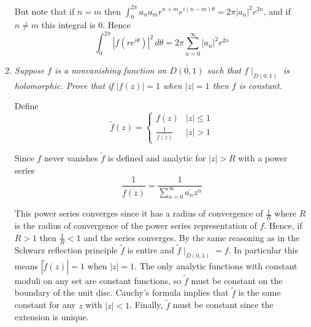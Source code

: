 \documentclass[letterpaper, 11pt]{article}
\begin{document}
\begin{enumerate}
But note that if $n=m$ then $\int_0^{2\pi} a_n\overline{a_m} r^{n+m} e^{i(n-m)\theta} = 2\pi |a_n|^2 r^{2n}$, and if $n \neq m$ this integral is $0$.  Hence
\[
\int_0^{2\pi} \left|f\left(re^{i\theta}\right)\right|^2 \,d\theta = 2\pi \sum_{n=0}^\infty |a_n|^2 r^{2n}
\]

\item \emph{Suppose $f$ is a nonvanishing function on $\overline{D(0,1)}$ such that $f\mid_{D(0,1)}$ is holomorphic.  Prove that if $|f(z)|=1$ when $|z|=1$ then $f$ is constant.}

Define $$\tilde{f}(z) = \begin{cases} f(z) & |z|\leq 1 \\ \frac{1}{\overline{f(\overline{z})}} & |z|>1\end{cases}$$

Since $f$ never vanishes $\tilde{f}$ is defined and analytic for $|z| > R$ with a power series
\[
\frac{1}{\overline{f(\overline{z})}} = \frac{1}{\sum_{n=0}^\infty \overline{a_n} z^n}
\]

This power series converges since it has a radius of convergence of $\frac{1}{R}$ where $R$ is the radius of convergence of the power series representation of $f$.  Hence, if $R > 1$ then $\frac{1}{R} < 1$ and the series converges.  By the same reasoning as in the Schwarz reflection principle $\tilde{f}$ is entire and $\tilde{f}\mid_{\overline{D(0,1)}} = f$.  In particular this means $\left|\tilde{f}(z)\right| = 1$ when $|z| = 1$.  The only analytic functions with constant moduli on any set are constant functions, so $\tilde{f}$ must be constant on the boundary of the unit disc.  Cauchy's formula implies that $\tilde{f}$ is the same constant for any $z$ with $|z| < 1$.  Finally, $\tilde{f}$ must be constant since the extension is unique.

\end{enumerate}
\end{document}
